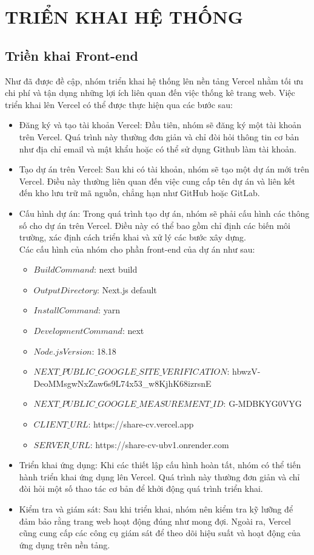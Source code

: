 \section{TRIỂN KHAI HỆ THỐNG}
\subsection{Triền khai Front-end}
Như đã được đề cập, nhóm triển khai hệ thống lên nền tảng Vercel nhằm tối ưu chi phí và tận dụng những lợi ích liên quan đến việc thống kê trang web. Việc triển khai lên Vercel có thể được thực hiện qua các bước sau:
\begin{itemize}
    \item Đăng ký và tạo tài khoản Vercel: Đầu tiên, nhóm sẽ đăng ký một tài khoản trên Vercel. Quá trình này thường đơn giản và chỉ đòi hỏi thông tin cơ bản như địa chỉ email và mật khẩu hoặc có thể sử dụng Github làm tài khoản.
    \item Tạo dự án trên Vercel: Sau khi có tài khoản, nhóm sẽ tạo một dự án mới trên Vercel. Điều này thường liên quan đến việc cung cấp tên dự án và liên kết đến kho lưu trữ mã nguồn, chẳng hạn như GitHub hoặc GitLab.
    \item Cấu hình dự án: Trong quá trình tạo dự án, nhóm sẽ phải cấu hình các thông số cho dự án trên Vercel. Điều này có thể bao gồm chỉ định các biến môi trường, xác định cách triển khai và xử lý các bước xây dựng. \\
    
    Các cấu hình của nhóm cho phần front-end của dự án như sau: 
    \begin{itemize}
        \item $Build Command$: next build
        \item $Output Directory$: Next.js default
        \item $Install Command$: yarn
        \item $Development Command$: next
        \item $Node.js Version$: 18.18
        \item $NEXT\_PUBLIC\_GOOGLE\_SITE\_VERIFICATION$: hbwzV-DeoMMsgwNxZaw6s9L74x53\_w8KjhK68izrsnE
        \item $NEXT\_PUBLIC\_GOOGLE\_MEASUREMENT\_ID$: G-MDBKYG0VYG
        \item $CLIENT\_URL$: https://share-cv.vercel.app
        \item $SERVER\_URL$: https://share-cv-ubv1.onrender.com
    \end{itemize}
    \item Triển khai ứng dụng: Khi các thiết lập cấu hình hoàn tất, nhóm có thể tiến hành triển khai ứng dụng lên Vercel. Quá trình này thường đơn giản và chỉ đòi hỏi một số thao tác cơ bản để khởi động quá trình triển khai.
    \item Kiểm tra và giám sát: Sau khi triển khai, nhóm nên kiểm tra kỹ lưỡng để đảm bảo rằng trang web hoạt động đúng như mong đợi. Ngoài ra, Vercel cũng cung cấp các công cụ giám sát để theo dõi hiệu suất và hoạt động của ứng dụng trên nền tảng.
\end{itemize}

